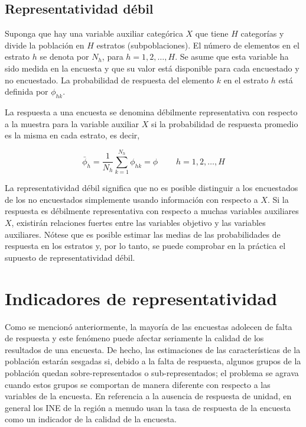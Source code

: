 \documentclass[
  12pt,
  spanish,
]{book}
\begin{document}
\hypertarget{representatividad-duxe9bil}{%
\subsection{Representatividad débil}\label{representatividad-duxe9bil}}

Suponga que hay una variable auxiliar categórica \(X\) que tiene \(H\)
categorías y divide la población en \(H\) estratos (subpoblaciones).
El número de elementos en el estrato \(h\) se denota por \(N_{h}\),
para \(h=1,2,\ldots,H\). Se asume que esta variable ha sido medida
en la encuesta y que su valor está disponible para cada encuestado
y no encuestado. La probabilidad de respuesta del elemento \(k\) en
el estrato \(h\) está definida por \(\phi_{hk}\).

La respuesta a una encuesta se denomina débilmente representativa
con respecto a la muestra para la variable auxiliar \(X\) si la probabilidad
de respuesta promedio es la misma en cada estrato, es decir,

\[
\bar{\phi}_{h} =  
\frac{1}{N_{h}}\sum_{k=1}^{N_{h}}\phi_{hk} =
\phi \ \ \ \ \ \ \ \ \ \  h=1,2,\ldots,H
\]

La representatividad débil significa que no es posible distinguir
a los encuestados de los no encuestados simplemente usando información
con respecto a \(X\). Si la respuesta es débilmente representativa con respecto a muchas variables auxiliares \(X\), existirán relaciones fuertes entre las variables objetivo y las variables auxiliares. Nótese que es posible estimar las medias de las probabilidades de respuesta en los estratos y, por lo tanto, se puede comprobar en la práctica el supuesto de representatividad débil.

\hypertarget{indicadores-de-representatividad}{%
\section{Indicadores de representatividad}\label{indicadores-de-representatividad}}

Como se mencionó anteriormente, la mayoría de las encuestas adolecen de falta de respuesta y este fenómeno puede afectar seriamente la calidad de
los resultados de una encuesta. De hecho, las estimaciones de las características de la población estarán sesgadas si, debido a la falta de respuesta, algunos grupos de la población quedan sobre-representados o sub-representados; el problema se agrava cuando estos grupos
se comportan de manera diferente con respecto a las variables de la
encuesta. En referencia a la ausencia de respuesta de unidad, en general los INE de la región a menudo usan la tasa de respuesta de la encuesta como un indicador de la calidad de la encuesta.
\end{document}
